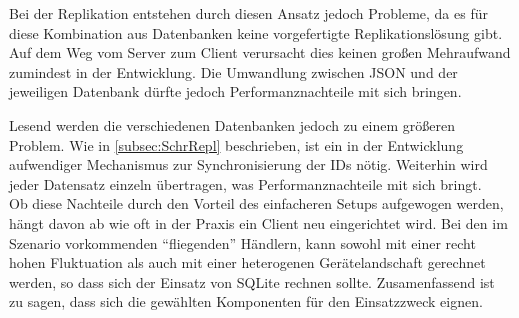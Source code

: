 \documentclass[12pt,a4paper,ngerman,english]{report}
\begin{document}
Bei der Replikation entstehen durch diesen Ansatz jedoch Probleme, da es für diese Kombination aus Datenbanken keine vorgefertigte Replikationslösung gibt. Auf dem Weg vom Server zum Client verursacht dies keinen großen Mehraufwand zumindest in der Entwicklung. Die Umwandlung zwischen JSON und der jeweiligen Datenbank dürfte jedoch Performanznachteile mit sich bringen.

Lesend werden die verschiedenen Datenbanken jedoch zu einem größeren Problem. Wie in \autoref{subsec:SchrRepl} beschrieben, ist ein in der Entwicklung aufwendiger Mechanismus zur Synchronisierung der IDs nötig. Weiterhin wird jeder Datensatz einzeln übertragen, was Performanznachteile mit sich bringt.\\

Ob diese Nachteile durch den Vorteil des einfacheren Setups aufgewogen werden, hängt davon ab wie oft in der Praxis ein Client neu eingerichtet wird. Bei den im Szenario vorkommenden ``fliegenden'' Händlern, kann sowohl mit einer recht hohen Fluktuation als auch mit einer heterogenen Gerätelandschaft gerechnet werden, so dass sich der Einsatz von SQLite rechnen sollte. Zusamenfassend ist zu sagen, dass sich die gewählten Komponenten für den Einsatzzweck eignen.

{}

\end{document}
